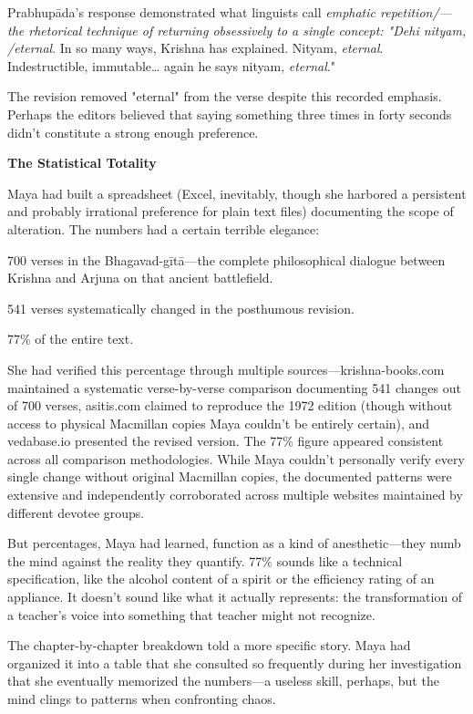 \documentclass[12pt,twoside]{book}
\begin{document}
Prabhupāda's response demonstrated what linguists call \emph{emphatic repetition/—the rhetorical technique of returning obsessively to a single concept: "Dehi nityam, /eternal}. In so many ways, Krishna has explained. Nityam, \emph{eternal}. Indestructible, immutable\ldots{} again he says nityam, \emph{eternal}."

The revision removed "eternal" from the verse despite this recorded emphasis. Perhaps the editors believed that saying something three times in forty seconds didn't constitute a strong enough preference.

\textbf{\textbf{The Statistical Totality}}

Maya had built a spreadsheet (Excel, inevitably, though she harbored a persistent and probably irrational preference for plain text files) documenting the scope of alteration. The numbers had a certain terrible elegance:

700 verses in the Bhagavad-gītā—the complete philosophical dialogue between Krishna and Arjuna on that ancient battlefield.

541 verses systematically changed in the posthumous revision.

77\% of the entire text.

She had verified this percentage through multiple sources—krishna-books.com maintained a systematic verse-by-verse comparison documenting 541 changes out of 700 verses, asitis.com claimed to reproduce the 1972 edition (though without access to physical Macmillan copies Maya couldn't be entirely certain), and vedabase.io presented the revised version. The 77\% figure appeared consistent across all comparison methodologies. While Maya couldn't personally verify every single change without original Macmillan copies, the documented patterns were extensive and independently corroborated across multiple websites maintained by different devotee groups.

But percentages, Maya had learned, function as a kind of anesthetic—they numb the mind against the reality they quantify. 77\% sounds like a technical specification, like the alcohol content of a spirit or the efficiency rating of an appliance. It doesn't sound like what it actually represents: the transformation of a teacher's voice into something that teacher might not recognize.

The chapter-by-chapter breakdown told a more specific story. Maya had organized it into a table that she consulted so frequently during her investigation that she eventually memorized the numbers—a useless skill, perhaps, but the mind clings to patterns when confronting chaos.
\end{document}
